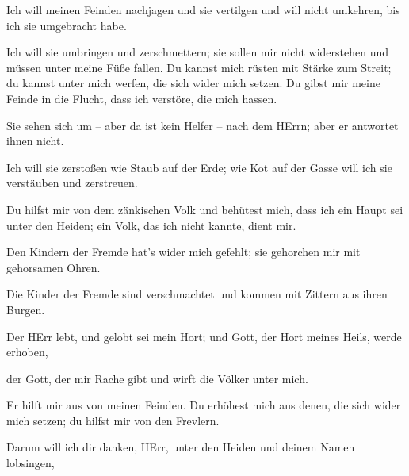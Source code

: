  Ich will meinen Feinden nachjagen und sie vertilgen und
will nicht umkehren, bis ich sie umgebracht habe.

 Ich will sie umbringen und zerschmettern; sie sollen mir
nicht widerstehen und müssen unter meine Füße fallen.  Du
kannst mich rüsten mit Stärke zum Streit; du kannst unter mich werfen,
die sich wider mich setzen.  Du gibst mir meine Feinde in
die Flucht, dass ich verstöre, die mich hassen.

 Sie sehen sich um -- aber da ist kein Helfer -- nach dem
HErrn; aber er antwortet ihnen nicht.

 Ich will sie zerstoßen wie Staub auf der Erde; wie Kot auf
der Gasse will ich sie verstäuben und zerstreuen.

 Du hilfst mir von dem zänkischen Volk und behütest mich,
dass ich ein Haupt sei unter den Heiden; ein Volk, das ich nicht kannte,
dient mir.

 Den Kindern der Fremde hat's wider mich gefehlt; sie
gehorchen mir mit gehorsamen Ohren.

 Die Kinder der Fremde sind verschmachtet und kommen mit
Zittern aus ihren Burgen.

 Der HErr lebt, und gelobt sei mein Hort; und Gott, der
Hort meines Heils, werde erhoben,

 der Gott, der mir Rache gibt und wirft die Völker unter
mich.

 Er hilft mir aus von meinen Feinden. Du erhöhest mich aus
denen, die sich wider mich setzen; du hilfst mir von den Frevlern.

 Darum will ich dir danken, HErr, unter den Heiden und
deinem Namen lobsingen,

